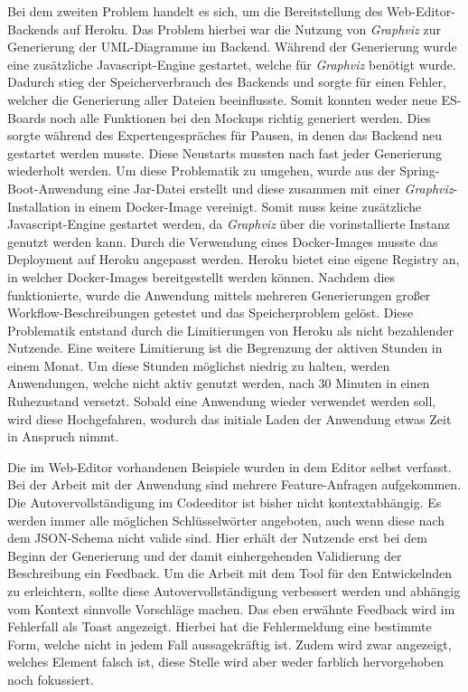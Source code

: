 Bei dem zweiten Problem handelt es sich, um die Bereitstellung des Web-Editor-Backends auf Heroku.
Das Problem hierbei war die Nutzung von \textit{Graphviz} zur Generierung der \ac{UML}-Diagramme im Backend.
Während der Generierung wurde eine zusätzliche Javascript-Engine gestartet, welche für \textit{Graphviz} benötigt wurde.
Dadurch stieg der Speicherverbrauch des Backends und sorgte für einen Fehler, welcher die Generierung aller Dateien beeinflusste.
Somit konnten weder neue \ac{ES}-Boards noch alle Funktionen bei den Mockups richtig generiert werden.
Dies sorgte während des Expertengespräches für Pausen, in denen das Backend neu gestartet werden musste.
Diese Neustarts mussten nach fast jeder Generierung wiederholt werden.
Um diese Problematik zu umgehen, wurde aus der Spring-Boot-Anwendung eine Jar-Datei erstellt und diese zusammen mit einer \textit{Graphviz}-Installation in einem Docker-Image
vereinigt\cite*{size-problem}.
Somit muss keine zusätzliche Javascript-Engine gestartet werden, da \textit{Graphviz} über die vorinstallierte Instanz genutzt werden kann.
Durch die Verwendung eines Docker-Images musste das Deployment auf Heroku angepasst werden.
Heroku bietet eine eigene Registry an, in welcher Docker-Images bereitgestellt werden können\cite*{heroku-registry}.
Nachdem dies funktionierte, wurde die Anwendung mittels mehreren Generierungen großer Workflow-Beschreibungen getestet und das Speicherproblem gelöst.
Diese Problematik entstand durch die Limitierungen von Heroku als nicht bezahlender Nutzende\cite*{size-problem}.
Eine weitere Limitierung ist die Begrenzung der aktiven Stunden in einem Monat.
Um diese Stunden möglichst niedrig zu halten, werden Anwendungen, welche nicht aktiv genutzt werden, nach 30 Minuten in einen Ruhezustand versetzt.
Sobald eine Anwendung wieder verwendet werden soll, wird diese Hochgefahren, wodurch das initiale Laden der Anwendung etwas Zeit in Anspruch nimmt\cite*{heroku-limits}.

Die im Web-Editor vorhandenen Beispiele wurden in dem Editor selbst verfasst.
Bei der Arbeit mit der Anwendung sind mehrere Feature-Anfragen aufgekommen.
Die Autovervollständigung im Codeeditor ist bisher nicht kontextabhängig.
Es werden immer alle möglichen Schlüsselwörter angeboten, auch wenn diese nach dem JSON-Schema nicht valide sind.
Hier erhält der Nutzende erst bei dem Beginn der Generierung und der damit einhergehenden Validierung der Beschreibung ein Feedback.
Um die Arbeit mit dem Tool für den Entwickelnden zu erleichtern, sollte diese Autovervollständigung verbessert werden und abhängig vom Kontext
sinnvolle Vorschläge machen.
Das eben erwähnte Feedback wird im Fehlerfall als Toast angezeigt.
Hierbei hat die Fehlermeldung eine bestimmte Form, welche nicht in jedem Fall aussagekräftig ist.
Zudem wird zwar angezeigt, welches Element falsch ist, diese Stelle wird aber weder farblich hervorgehoben noch fokussiert.

